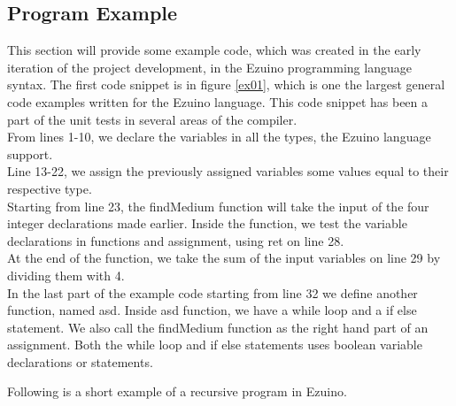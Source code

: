 \subsection{Program Example}
This section will provide some example code, which was created in the early iteration of the project development, in the Ezuino programming language syntax. The first code snippet is in figure \ref{ex01}, which is one the largest general code examples written for the Ezuino language. This code snippet has been a part of the unit tests in several areas of the compiler. \\
From lines 1-10, we declare the variables in all the types, the Ezuino language support. \\
Line 13-22, we assign the previously assigned variables some values equal to their respective type. \\
Starting from line 23, the findMedium function will take the input of the four integer declarations made earlier. Inside the function, we test the variable declarations in functions and assignment, using ret on line 28.\\
At the end of the function, we take the sum of the input variables on line 29 by dividing them with 4. \\
In the last part of the example code starting from line 32 we define another function, named asd. Inside asd function, we have a while loop and a if else statement. We also call the findMedium function as the right hand part of an assignment. Both the while loop and if else statements uses boolean variable declarations or statements.

\noindent\newline
Following is a short example of a recursive program in Ezuino.

\noindent\newline